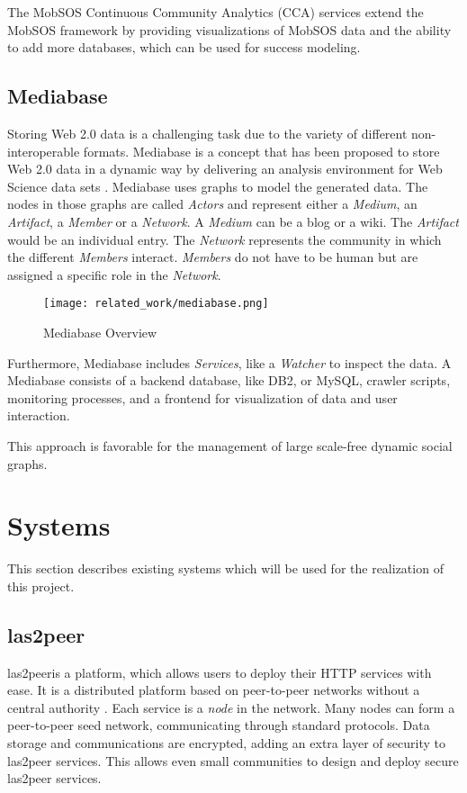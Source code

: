 The MobSOS Continuous Community Analytics (CCA) services extend the MobSOS framework by providing visualizations of MobSOS data and the ability to add more databases, which can be used for success modeling.

\subsection{Mediabase}
Storing Web 2.0 data is a challenging task due to the variety of different non-interoperable formats.
Mediabase is a concept that has been proposed to store Web 2.0 data in a dynamic way by delivering an analysis environment for Web Science data sets \cite{KlPe08}.
Mediabase uses graphs to model the generated data.
The nodes in those graphs are called \emph{Actors} and represent either a \emph{ Medium}, an \emph{Artifact}, a \emph{Member} or a \emph{Network}.
A \emph{ Medium} can be a blog or a wiki.
The \emph{Artifact} would be an individual entry.
The \emph{Network} represents the community in which the different \emph{Members} interact.
\emph{Members} do not have to be human but are assigned a specific role in the \emph{Network}.
\begin{figure}[h]
    \centering
    \texttt{[image: related\_work/mediabase.png]}
    \caption{Mediabase Overview \cite{Klam10e}}
\end{figure}
Furthermore, Mediabase includes \emph{Services}, like a \emph{Watcher} to inspect the data.
A Mediabase consists of a backend database, like DB2, or MySQL, crawler scripts, monitoring processes, and a frontend for visualization of data and user interaction.

This approach is favorable for the management of large scale-free dynamic social graphs.

\section{Systems} \label{lab:systems}
This section describes existing systems which will be used for the realization of this project.

\subsection{las2peer}
las2peer\footnotemark is a platform, which allows users to deploy their HTTP services with ease. 
It is a distributed platform based on peer-to-peer networks without a central authority \cite{KRdJ16}.
Each service is a \emph{node} in the network. Many nodes can form a peer-to-peer seed network, communicating through standard protocols. 
Data storage and communications are encrypted, adding an extra layer of security to las2peer services.
This allows even small communities to design and deploy secure las2peer services. 

